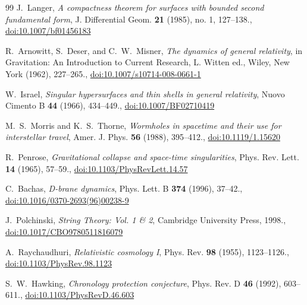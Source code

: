 \documentclass[11pt,reqno]{amsart}
\theoremstyle{definition}
\numberwithin{equation}{section}
\begin{document}
\begin{thebibliography}{99}
J.~Langer,
\emph{A compactness theorem for surfaces with bounded second fundamental form},
J. Differential Geom. \textbf{21} (1985), no. 1, 127--138., \href{https://doi.org/10.1007/bf01456183}{doi:10.1007/bf01456183}

R.~Arnowitt, S.~Deser, and C.~W.~Misner,
\emph{The dynamics of general relativity},
in Gravitation: An Introduction to Current Research, L. Witten ed., Wiley, New York (1962), 227--265., \href{https://doi.org/10.1007/s10714-008-0661-1}{doi:10.1007/s10714-008-0661-1}

W.~Israel,
\emph{Singular hypersurfaces and thin shells in general relativity},
Nuovo Cimento B \textbf{44} (1966), 434--449., \href{https://doi.org/10.1007/BF02710419}{doi:10.1007/BF02710419}

M.~S.~Morris and K.~S.~Thorne,
\emph{Wormholes in spacetime and their use for interstellar travel},
Amer. J. Phys. \textbf{56} (1988), 395--412., \href{https://doi.org/10.1119/1.15620}{doi:10.1119/1.15620}

R.~Penrose,
\emph{Gravitational collapse and space-time singularities},
Phys. Rev. Lett. \textbf{14} (1965), 57--59., \href{https://doi.org/10.1103/PhysRevLett.14.57}{doi:10.1103/PhysRevLett.14.57}

C.~Bachas,
\emph{D-brane dynamics},
Phys. Lett. B \textbf{374} (1996), 37--42., \href{https://doi.org/10.1016/0370-2693(96)00238-9}{doi:10.1016/0370-2693(96)00238-9}

J.~Polchinski,
\emph{String Theory: Vol. 1 \& 2},
Cambridge University Press, 1998., \href{https://doi.org/10.1017/CBO9780511816079}{doi:10.1017/CBO9780511816079}

A.~Raychaudhuri,
\emph{Relativistic cosmology I},
Phys. Rev. \textbf{98} (1955), 1123--1126., \href{https://doi.org/10.1103/PhysRev.98.1123}{doi:10.1103/PhysRev.98.1123}

S.~W.~Hawking,
\emph{Chronology protection conjecture},
Phys. Rev. D \textbf{46} (1992), 603--611., \href{https://doi.org/10.1103/PhysRevD.46.603}{doi:10.1103/PhysRevD.46.603}

\end{thebibliography}
\end{document}
